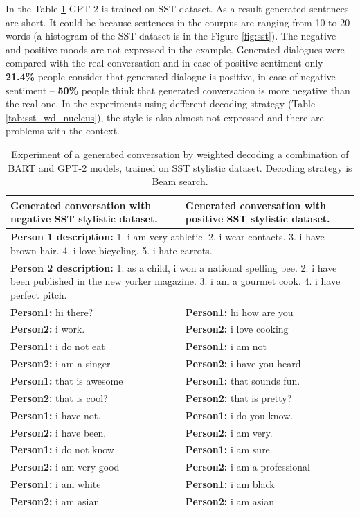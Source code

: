 In the Table \ref{tab:sst_wd} GPT-2 is trained on SST dataset. As a result generated sentences are short. It could be because sentences in the courpus are ranging from 10 to 20 words (a histogram of the SST dataset is in the Figure \ref{fig:sst}). The negative and positive moods are not expressed in the example. Generated dialogues were compared with the real conversation and in case of positive sentiment only \textbf{21.4\%} people consider that generated dialogue is positive, in case of negative sentiment -- \textbf{50\%} people think that generated conversation is more negative than the real one. In the experiments using defferent decoding strategy (Table \ref{tab:sst_wd_nucleus}), the style is also almost not expressed and there are problems with the context. 

\begin{table}[H]
\centering
 \begin{tabular}{|p{7cm}|p{7cm}|} 
 \hline
 \textbf{Generated conversation with negative SST stylistic dataset.} & \textbf{Generated conversation with positive SST stylistic dataset.}\\
 \hline
 \multicolumn{2}{|p{14cm}|}{\textbf{Person 1 description:} 1. i am very athletic. 2. i wear contacts. 3. i have brown hair. 4. i love bicycling. 5. i hate carrots.} \\
 \hline
 \multicolumn{2}{|p{14cm}|}{\textbf{Person 2 description:} 1. as a child, i won a national spelling bee. 2. i have been published in the new yorker magazine. 3. i am a gourmet cook. 4. i have perfect pitch.} \\
 \hline
 \textbf{Person1:} hi there? & \textbf{Person1:} hi how are you \\
 \textbf{Person2:} i work. &  \textbf{Person2:} i love cooking \\ 
 \textbf{Person1:} i do not eat & \textbf{Person1:} i am not \\
 \textbf{Person2:} i am a singer & \textbf{Person2:} i have you heard \\
 \textbf{Person1:} that is awesome & \textbf{Person1:} that sounds fun. \\
 \textbf{Person2:} that is cool? & \textbf{Person2:} that is pretty?  \\
 \textbf{Person1:} i have not. & \textbf{Person1:} i do you know. \\
 \textbf{Person2:} i have been. & \textbf{Person2:} i am very. \\
 \textbf{Person1:} i do not know & \textbf{Person1:} i am sure. \\
 \textbf{Person2:} i am very good & \textbf{Person2:} i am a professional \\
 \textbf{Person1:} i am white & \textbf{Person1:} i am black \\
 \textbf{Person2:} i am asian & \textbf{Person2:} i am asian \\
 \hline
 \end{tabular}
 \caption{Experiment of a generated conversation by weighted decoding a combination of BART and GPT-2 models, trained on SST stylistic dataset. Decoding strategy is Beam search.}
\label{tab:sst_wd}
\end{table}

